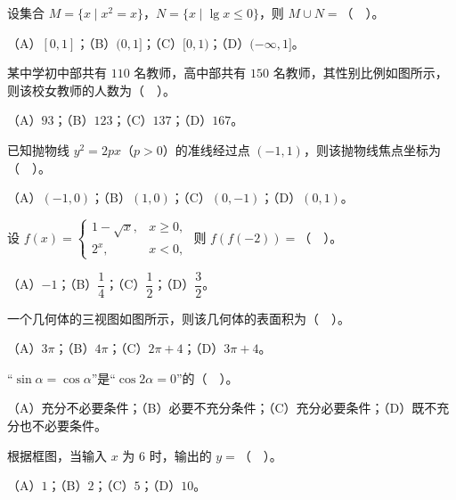 \begin{question}
设集合 $M=\{x\mid x^{2}=x\}$，$N=\{x\mid \lg x\le 0\}$，则 $M\cup N=$（　）。

（A）$[0,1]$；（B）$(0,1]$；（C）$[0,1)$；（D）$(-\infty,1]$。

\Needspace{0.4\textheight}
\end{question}
\begin{question}
某中学初中部共有 $110$ 名教师，高中部共有 $150$ 名教师，其性别比例如图所示，则该校女教师的人数为（　）。
\nopagebreak[4]
\begin{center}\end{center}
\nopagebreak[4]
（A）$93$；（B）$123$；（C）$137$；（D）$167$。

\end{question}
\begin{question}
已知抛物线 $y^{2}=2px$（$p>0$）的准线经过点 $(-1,1)$，则该抛物线焦点坐标为（　）。

（A）$(-1,0)$；（B）$(1,0)$；（C）$(0,-1)$；（D）$(0,1)$。

\end{question}
\begin{question}
设 $f(x)=\begin{cases}1-\sqrt{x}, & x\ge 0,\\[2pt] 2^{x}, & x<0,\end{cases}$ 则 $f(f(-2))=$（　）。

（A）$-1$；（B）$\dfrac{1}{4}$；（C）$\dfrac{1}{2}$；（D）$\dfrac{3}{2}$。

\Needspace{0.4\textheight}
\end{question}
\begin{question}
一个几何体的三视图如图所示，则该几何体的表面积为（　）。
\nopagebreak[4]
\begin{center}\end{center}
\nopagebreak[4]
（A）$3\pi$；（B）$4\pi$；（C）$2\pi+4$；（D）$3\pi+4$。

\end{question}
\begin{question}
“$\sin\alpha=\cos\alpha$”是“$\cos 2\alpha=0$”的（　）。

（A）充分不必要条件；（B）必要不充分条件；（C）充分必要条件；（D）既不充分也不必要条件。

\Needspace{0.4\textheight}
\end{question}
\begin{question}
根据框图，当输入 $x$ 为 $6$ 时，输出的 $y=$（　）。
\nopagebreak[4]
\begin{center}\end{center}
\nopagebreak[4]
（A）$1$；（B）$2$；（C）$5$；（D）$10$。

\end{question}

